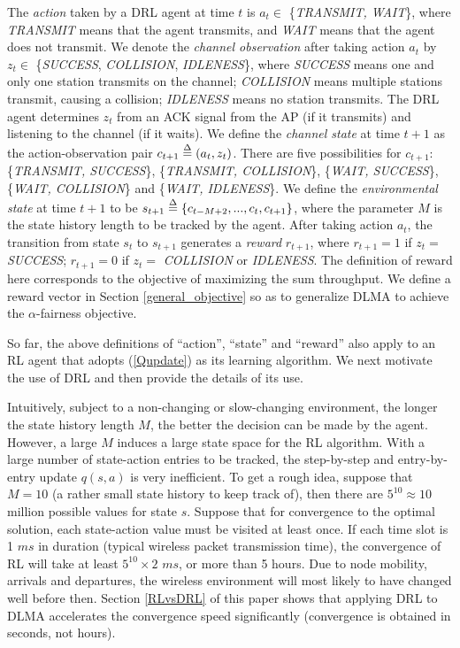 \documentclass[journal,comsoc]{IEEEtran}
\begin{document}
The \textit{action} taken by a DRL agent at time $ t $ is $ {a_t} \in$  \{\textit{TRANSMIT, WAIT}\}, where \textit{TRANSMIT} means that the agent transmits, and \textit{WAIT} means that the agent does not transmit. We denote the \textit{channel observation} after taking action $ a_t $ by $ {z_t} \in$ \{\textit{SUCCESS}, \textit{COLLISION}, \textit{IDLENESS}\}, where \textit{SUCCESS} means one and only one station transmits on the channel; \textit{COLLISION} means multiple stations transmit, causing a collision; \textit{IDLENESS} means no station transmits. The DRL agent determines $ z_t $  from an ACK signal from the AP (if it transmits) and listening to the channel (if it waits). We define the \textit{channel state} at time $ t + 1 $ as the action-observation pair $ {c_{t+1}} \buildrel \Delta \over = \left( {{a_t},{z_t}} \right) $. There are five possibilities for  $ c_{t+1}$: \{\textit{TRANSMIT, SUCCESS}\}, \{\textit{TRANSMIT, COLLISION}\}, \{\textit{WAIT, SUCCESS}\}, \{\textit{WAIT, COLLISION}\} and \{\textit{WAIT, IDLENESS}\}.  We define the \textit{environmental state} at time $  t + 1  $ to be $ {s_{t+1}} \buildrel \Delta \over = \left\{ {{c_{t - M+2 }},...,{c_{t}},{c_{t+1}}} \right\} $, where the parameter $ M $  is the state history length to be tracked by the agent. After taking action $ a_t $, the transition from state $ s_t $ to $ s_{t+1} $ generates a \textit{reward} $ r_{t+1} $, where $ r_{t+1}=1 $ if $ z_t= $ \textit{SUCCESS}; $ r_{t+1}=0 $ if $ z_t=$ \textit{COLLISION} or \textit{IDLENESS}. The definition of reward here corresponds to the objective of maximizing the sum throughput. We define a reward vector in Section \ref{general_objective}  so as to generalize DLMA to achieve the  $ \alpha $-fairness objective.  

So far, the above definitions of ``action'', ``state'' and ``reward'' also apply to an RL agent that adopts (\ref{Qupdate}) as its learning algorithm. We next motivate the use of DRL and then provide the details of its use. 

Intuitively, subject to a non-changing or slow-changing environment, the longer the state history length $ M $, the better the decision can be made by the agent. However, a large $ M $ induces a large state space for the RL algorithm. With a large number of state-action entries to be tracked, the step-by-step and entry-by-entry update $ q\left( s, a\right)  $ is very inefficient. To get a rough idea, suppose that $ M=10 $ (a rather small state history to keep track of), then there are $ 5^{10}\approx 10 $ million possible values for state $ s $. Suppose that for convergence to the optimal solution, each state-action value must be visited at least once. If each time slot is 1 $ ms $ in duration (typical wireless packet transmission time), the convergence of RL will take at least $ 5^{10} \times 2 $ $ ms $, or more than 5 hours. Due to node mobility, arrivals and departures, the wireless environment will most likely to have changed well before then. Section \ref{RLvsDRL} of this paper shows that applying  DRL to DLMA accelerates the convergence speed significantly (convergence is obtained in seconds, not hours). 
\end{document}
